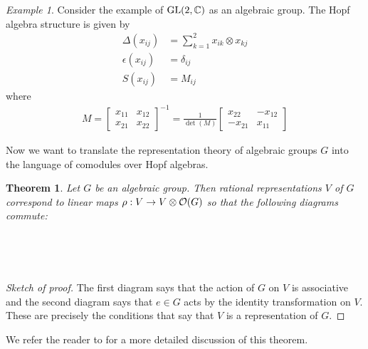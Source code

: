 \documentclass{amsart}
\numberwithin{equation}{section}
\theoremstyle{plain} %
\newtheorem{theorem}[equation]{Theorem}
\theoremstyle{definition}
\theoremstyle{remark}
\newtheorem{example}[equation]{Example}
\begin{document}
\begin{example}
    Consider the example of $\operatorname{GL}(2,\mathbb{C})$ as an algebraic group. The Hopf algebra structure is given by
    \begin{align*}
        \Delta(x_{ij}) &= \sum_{k=1}^2 x_{ik}\otimes x_{kj} \\
        \epsilon(x_{ij}) &= \delta_{ij} \\
        S(x_{ij}) &= M_{ij}
    \end{align*} where \begin{align*}
        M = \begin{bmatrix}
            x_{11} & x_{12} \\
            x_{21} & x_{22}
        \end{bmatrix}^{-1} = \frac{1}{\det(M)}\begin{bmatrix}
            x_{22} & -x_{12} \\
            -x_{21} & x_{11}
        \end{bmatrix}
    \end{align*}
\end{example}

\hfill

Now we want to translate the representation theory of algebraic groups $G$ into the language of comodules over Hopf algebras.
\begin{theorem}
    Let $G$ be an algebraic group. Then rational representations $V$ of $G$ 
    correspond to linear maps $\rho: V\to V\otimes \mathcal{O}(G)$ so that the following diagrams commute:
    \begin{center}
         \\

         \\
    \end{center}
\end{theorem}
\begin{proof}
    [Sketch of proof] The first diagram says that the action of $G$ on $V$ is associative 
    and the second diagram says that $e\in G$ acts by the identity transformation on $V$. 
    These are precisely the conditions that say that $V$ is a representation of $G$.
\end{proof}
We refer the reader to \cite{waterhouse} for a more detailed discussion of this theorem.
\end{document}
